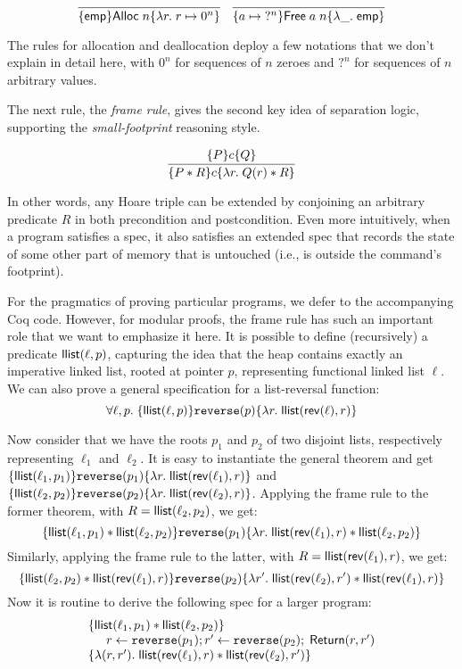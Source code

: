 \documentclass{amsbook}
\theoremstyle{definition}
\theoremstyle{remark}
\numberwithin{section}{chapter}
\numberwithin{equation}{chapter}
\begin{document}
$$\infer{\hoare{\emp}{\mt{Alloc} \; n}{\lambda r. \; \ptsto{r}{0^n}}}{}
\quad \infer{\hoare{\ptsto{a}{\; ?^n}}{\mt{Free} \; a \; n}{\lambda \_. \; \emp}}{}$$

The rules for allocation and deallocation deploy a few notations that we don't explain in detail here, with $0^n$ for sequences of $n$ zeroes and $?^n$ for sequences of $n$ arbitrary values.

The next rule, the \emph{frame rule}, gives the second key idea of separation logic, supporting the \emph{small-footprint} reasoning style.

$$\infer{\hoare{P * R}{c}{\lambda r. \; Q(r) * R}}{
  \hoare{P}{c}{Q}
}$$

In other words, any Hoare triple can be extended by conjoining an arbitrary predicate $R$ in both precondition and postcondition.
Even more intuitively, when a program satisfies a spec, it also satisfies an extended spec that records the state of some other part of memory that is untouched (i.e., is outside the command's footprint).

For the pragmatics of proving particular programs, we defer to the accompanying Coq code.
\modularity
However, for modular proofs, the frame rule has such an important role that we want to emphasize it here.
It is possible to define (recursively) a predicate $\mathsf{llist}(\ell, p)$, capturing the idea that the heap contains exactly an imperative linked list, rooted at pointer $p$, representing functional linked list $\ell$.
We can also prove a general specification for a list-reversal function:
$$\forall \ell, p. \; \{\mathsf{llist}(\ell, p)\} \texttt{reverse}(p) \{\lambda r. \; \mathsf{llist}(\mathsf{rev}(\ell), r)\}$$

Now consider that we have the roots $p_1$ and $p_2$ of two disjoint lists, respectively representing $\ell_1$ and $\ell_2$.
It is easy to instantiate the general theorem and get $\{\mathsf{llist}(\ell_1, p_1)\} \texttt{reverse}(p_1) \{\lambda r. \; \mathsf{llist}(\mathsf{rev}(\ell_1), r)\}$ and $\{\mathsf{llist}(\ell_2, p_2)\} \texttt{reverse}(p_2) \{\lambda r. \; \mathsf{llist}(\mathsf{rev}(\ell_2), r)\}$.
Applying the frame rule to the former theorem, with $R = \mathsf{llist}(\ell_2, p_2)$, we get:
$$\{\mathsf{llist}(\ell_1, p_1) * \mathsf{llist}(\ell_2, p_2)\} \texttt{reverse}(p_1) \{\lambda r. \; \mathsf{llist}(\mathsf{rev}(\ell_1), r) * \mathsf{llist}(\ell_2, p_2)\}$$
Similarly, applying the frame rule to the latter, with $R = \mathsf{llist}(\mathsf{rev}(\ell_1), r)$, we get:
$$\{\mathsf{llist}(\ell_2, p_2) * \mathsf{llist}(\mathsf{rev}(\ell_1), r)\} \texttt{reverse}(p_2) \{\lambda r'. \; \mathsf{llist}(\mathsf{rev}(\ell_2), r') * \mathsf{llist}(\mathsf{rev}(\ell_1), r)\}$$
Now it is routine to derive the following spec for a larger program:
$$\begin{array}{l}
  \{\mathsf{llist}(\ell_1, p_1) * \mathsf{llist}(\ell_2, p_2)\} \\
  \hspace{.2in} r \leftarrow \texttt{reverse}(p_1); r' \leftarrow \texttt{reverse}(p_2); \; \mathsf{Return}(r, r') \\
  \{\lambda (r, r'). \; \mathsf{llist}(\mathsf{rev}(\ell_1), r) * \mathsf{llist}(\mathsf{rev}(\ell_2), r')\}
\end{array}$$
\end{document}
